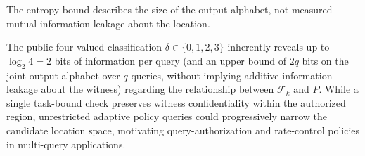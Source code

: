The entropy bound describes the size of the output alphabet, not measured mutual-information leakage about the location.

The public four-valued classification $\delta \in \{0, 1, 2, 3\}$ inherently reveals up to $\log_2 4 = 2$ bits of information per query (and an upper bound of $2q$ bits on the joint output alphabet over $q$ queries, without implying additive information leakage about the witness) regarding the relationship between $\mathcal{F}_k$ and $P$. While a single task-bound check preserves witness confidentiality within the authorized region, unrestricted adaptive policy queries could progressively narrow the candidate location space, motivating query-authorization and rate-control policies in multi-query applications.